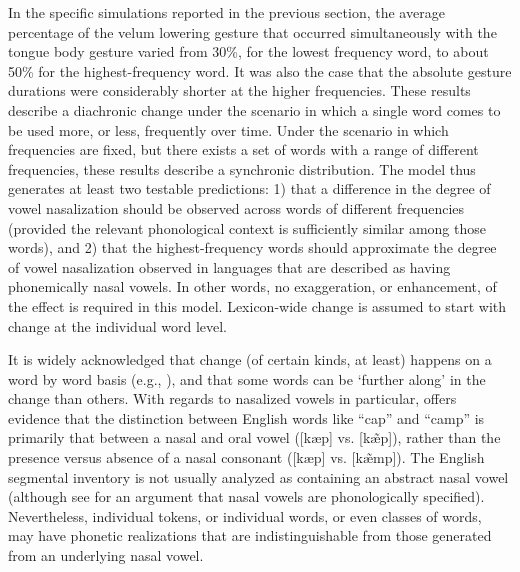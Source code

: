 In the specific simulations reported in the previous section, the
average percentage of the velum lowering gesture that occurred simultaneously
with the tongue body gesture varied from 30\%, for the lowest frequency
word, to about 50\% for the highest-frequency word. It was also the
case that the absolute gesture durations were considerably shorter
at the higher frequencies. These results describe a diachronic change
under the scenario in which a single word comes to be used more, or
less, frequently over time. Under the scenario in which frequencies
are fixed, but there exists a set of words with a range of different
frequencies, these results describe a synchronic distribution. The
model thus generates at least two testable predictions: 1) that a
difference in the degree of vowel nasalization should be observed
across words of different frequencies (provided the relevant phonological
context is sufficiently similar among those words), and 2) that the
highest-frequency words should approximate the degree of vowel nasalization
observed in languages that are described as having phonemically nasal
vowels. In other words, no exaggeration, or enhancement, of the effect
is required in this model. Lexicon-wide change is assumed to start
with change at the individual word level.

It is widely acknowledged that change (of certain kinds, at least)
happens on a word by word basis (e.g., \citealt{Phillips1984,Bybee2002,Pierrehumbert2002}),
and that some words can be `further along' in the change than others.
With regards to nasalized vowels in particular, \citet{malecot1960vowel}
offers evidence that the distinction between English words like “cap”
and “camp” is primarily that between a nasal and oral vowel
({[kæp]} vs. {[kæ̃p]}), rather than the presence
versus absence of a nasal consonant ({[kæp]} vs. {[kæ̃mp]}).
The English segmental inventory is not usually analyzed as containing
an abstract nasal vowel (although see \citet{Sole1992} for an argument
that nasal vowels are phonologically specified). Nevertheless, individual
tokens, or individual words, or even classes of words, may have phonetic
realizations that are indistinguishable from those generated from
an underlying nasal vowel. 
